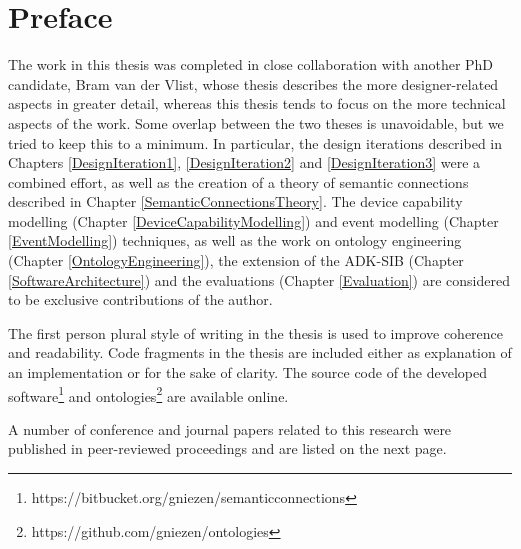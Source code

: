 \pagestyle{empty}

\begingroup

\chapter*{Preface}

The work in this thesis was completed in close collaboration with another PhD candidate, Bram van der Vlist, whose thesis \cite{Bram} describes the more designer-related aspects in greater detail, whereas this thesis tends to focus on the more technical aspects of the work. Some overlap between the two theses is unavoidable, but we tried to keep this to a minimum. In particular, the design iterations described in Chapters \ref{DesignIteration1}, \ref{DesignIteration2} and \ref{DesignIteration3} were a combined effort, as well as the creation of a theory of semantic connections described in Chapter \ref{SemanticConnectionsTheory}. The device capability modelling (Chapter \ref{DeviceCapabilityModelling}) and event modelling (Chapter \ref{EventModelling}) techniques, as well as the work on ontology engineering (Chapter \ref{OntologyEngineering}), the extension of the ADK-SIB (Chapter \ref{SoftwareArchitecture}) and the evaluations (Chapter \ref{Evaluation}) are considered to be exclusive contributions of the author. 

The first person plural style of writing in the thesis is used to improve coherence and readability. Code fragments in the thesis are included either as explanation of an implementation or for the sake of clarity. The source code of the developed software\footnote{https://bitbucket.org/gniezen/semanticconnections} and ontologies\footnote{https://github.com/gniezen/ontologies} are available online.

A number of conference and journal papers related to this research were published in peer-reviewed proceedings and are listed on the next page. 


\endgroup			

\vfill
